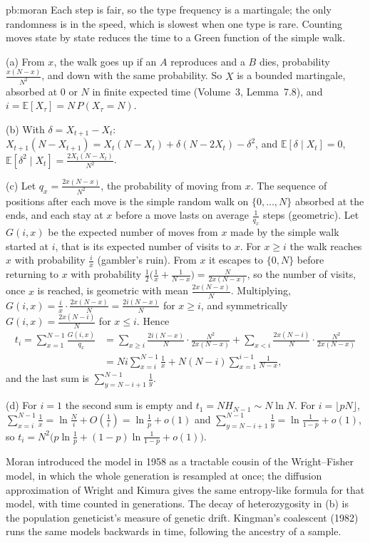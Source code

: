 \begin{solution}{pb:moran}
\idea Each step is fair, so the type frequency is a martingale; the only randomness is in the speed, which is slowest when one type is
rare. Counting moves state by state reduces the time to a Green function of the simple walk.

\writeup (a) From $x$, the walk goes up if an $A$ reproduces and a $B$ dies, probability $\frac{x(N-x)}{N^2}$, and down with the same probability. So $X$ is a bounded
martingale, absorbed at $0$ or $N$ in finite expected time (Volume~3, Lemma~7.8), and $i=\mathbb E[X_\tau]=N\,P(X_\tau=N)$.

(b) With $\delta=X_{t+1}-X_t$: $X_{t+1}(N-X_{t+1})=X_t(N-X_t)+\delta(N-2X_t)-\delta^2$, and $\mathbb E[\delta\mid X_t]=0$, $\mathbb E[\delta^2\mid X_t]=\frac{2X_t(N-X_t)}{N^2}$.

(c) Let $q_x=\frac{2x(N-x)}{N^2}$, the probability of moving from $x$. The sequence of positions after each move is the simple random walk on $\{0,\dots,N\}$ absorbed at the ends,
and each stay at $x$ before a move lasts on average $\frac1{q_x}$ steps (geometric). Let $G(i,x)$ be the expected number of moves from $x$ made by the simple walk
started at $i$, that is its expected number of visits to $x$. For $x\ge i$ the walk reaches $x$ with probability $\frac ix$ (gambler's ruin). From $x$ it escapes to $\{0,N\}$
before returning to $x$ with probability $\frac12\bigl(\frac1x+\frac1{N-x}\bigr)=\frac N{2x(N-x)}$, so the number of visits, once $x$ is reached, is geometric with mean $\frac{2x(N-x)}N$. Multiplying, $G(i,x)=\frac ix\cdot\frac{2x(N-x)}N=\frac{2i(N-x)}N$ for $x\ge i$, and symmetrically $G(i,x)=\frac{2x(N-i)}N$ for $x\le i$. Hence
\[
\begin{aligned}t_i=\sum_{x=1}^{N-1}\frac{G(i,x)}{q_x}&=\sum_{x\ge i}\frac{2i(N-x)}N\cdot\frac{N^2}{2x(N-x)}+\sum_{x<i}\frac{2x(N-i)}N\cdot\frac{N^2}{2x(N-x)}\\&=Ni\sum_{x=i}^{N-1}\frac1x+N(N-i)\sum_{x=1}^{i-1}\frac1{N-x},\end{aligned}
\]
and the last sum is $\sum_{y=N-i+1}^{N-1}\frac1y$.

(d) For $i=1$ the second sum is empty and $t_1=NH_{N-1}\sim N\ln N$. For $i=\lfloor pN\rfloor$, $\sum_{x=i}^{N-1}\frac1x=\ln\frac Ni+O(\frac1i)=\ln\frac1p+o(1)$ and $\sum_{y=N-i+1}^{N-1}\frac1y=\ln\frac1{1-p}+o(1)$, so
$t_i=N^2\bigl(p\ln\frac1p+(1-p)\ln\frac1{1-p}+o(1)\bigr)$.

\leads Moran introduced the model in 1958 as a tractable cousin of the Wright--Fisher model, in which the whole generation is resampled at
once; the diffusion approximation of Wright and Kimura gives the same entropy-like formula for that model, with time counted in
generations. The decay of heterozygosity in (b) is the population geneticist's measure of genetic drift. Kingman's coalescent (1982) runs the same
models backwards in time, following the ancestry of a sample.
\end{solution}


